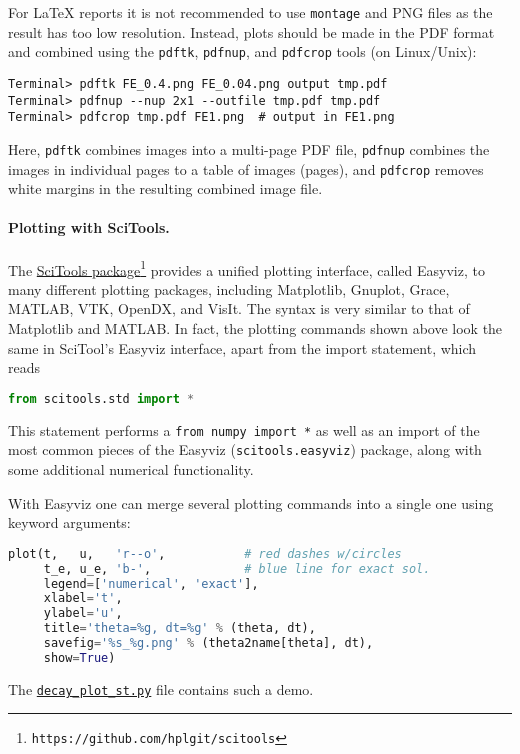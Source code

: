 \documentclass[graybox,sectrefs,envcountresetchap,open=right,final]{svmonodo}
\begin{document}

For {\LaTeX} reports it is not recommended to use \texttt{montage} and PNG files
as the result has too low resolution. Instead, plots should be made
in the PDF format and combined using the \texttt{pdftk}, \texttt{pdfnup}, and \texttt{pdfcrop} tools
(on Linux/Unix):

\begin{Verbatim}[frame=lines,label=\fbox{{\tiny Terminal}},framesep=2.5mm,framerule=0.7pt,fontsize=\fontsize{9pt}{9pt}]
Terminal> pdftk FE_0.4.png FE_0.04.png output tmp.pdf
Terminal> pdfnup --nup 2x1 --outfile tmp.pdf tmp.pdf
Terminal> pdfcrop tmp.pdf FE1.png  # output in FE1.png
\end{Verbatim}
Here, \texttt{pdftk} combines images into a multi-page PDF file, \texttt{pdfnup}
combines the images in individual pages to a table of images (pages),
and \texttt{pdfcrop} removes white margins in the resulting combined image file.


\paragraph{Plotting with SciTools.}
The \href{{https://github.com/hplgit/scitools}}{SciTools package}\footnote{\texttt{https://github.com/hplgit/scitools}} provides a
unified plotting interface, called Easyviz, to many different plotting
packages, including Matplotlib, Gnuplot, Grace, MATLAB,
VTK, OpenDX, and VisIt. The syntax is very similar to that of
Matplotlib and MATLAB. In fact, the plotting commands shown above look
the same in SciTool's Easyviz interface, apart from the import
statement, which reads

\begin{lstlisting}[language=Python,style=blue1_bluegreen]
from scitools.std import *
\end{lstlisting}
This statement performs a \texttt{from numpy import *} as well as an import
of the most common pieces of the Easyviz (\texttt{scitools.easyviz}) package,
along with some additional numerical functionality.

With Easyviz one can
merge several plotting commands into a single one
using keyword arguments:

\begin{lstlisting}[language=Python,style=blue1_bluegreen]
plot(t,   u,   'r--o',           # red dashes w/circles
     t_e, u_e, 'b-',             # blue line for exact sol.
     legend=['numerical', 'exact'],
     xlabel='t',
     ylabel='u',
     title='theta=%g, dt=%g' % (theta, dt),
     savefig='%s_%g.png' % (theta2name[theta], dt),
     show=True)
\end{lstlisting}
The \href{{http://tinyurl.com/ofkw6kc/alg/decay_plot_st.py}}{\nolinkurl{decay_plot_st.py}} file
contains such a demo.
\end{document}
